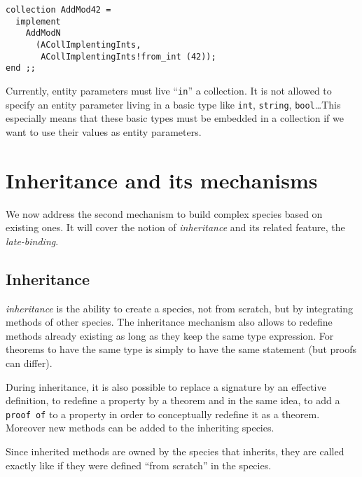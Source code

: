 {\scriptsize
\begin{lstlisting}
collection AddMod42 =
  implement
    AddModN
      (ACollImplentingInts,
       ACollImplentingInts!from_int (42));
end ;;
\end{lstlisting}
}


\smallskip

Currently, entity parameters must live ``{\tt in}'' a collection. It is not
allowed to specify an entity parameter living in a basic type like {\tt int},
{\tt string}, {\tt bool}\ldots This especially means that these basic types
must be embedded in a collection if we want to use their values as entity
parameters.



\section{Inheritance and its mechanisms}

We now address the second mechanism to build complex species
based on existing ones. It will cover the notion of {\em inheritance}
and its related feature, the {\em late-binding}.



\subsection{Inheritance}
\label{inheritance}
 {\focal} {\em inheritance} is the ability to create
a species, not from scratch, but by integrating methods of other
species.  The inheritance mechanism also allows to redefine methods
already existing as long as they keep the same type expression.  For
theorems to have the same type is simply to have the same statement
(but proofs can differ).

During inheritance, it is also possible to replace a signature by an
effective definition, to redefine a property by a theorem and in the
same idea, to add a {\tt proof of} to a property in order to
conceptually redefine it as a theorem. Moreover new methods can be
added to the inheriting species.

Since inherited methods are owned by the species that inherits, they are
called exactly like if they were defined ``from scratch'' in the species.

